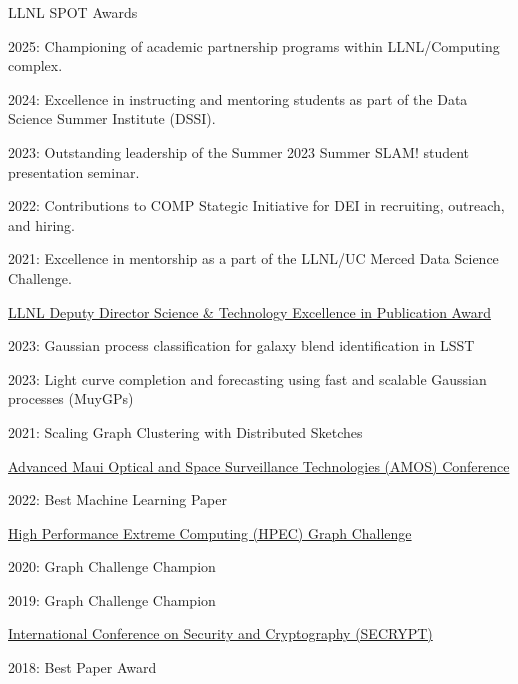LLNL SPOT Awards
\begin{innerlist}
  \item[] 2025: Championing of academic partnership programs within LLNL/Computing complex.
  \item[] 2024: Excellence in instructing and mentoring students as part of the Data Science Summer Institute (DSSI).
  \item[] 2023: Outstanding leadership of the Summer 2023 Summer SLAM! student presentation seminar. 
  \item[] 2022: Contributions to COMP Stategic Initiative for DEI in recruiting, outreach, and hiring.
  \item[] 2021: Excellence in mentorship as a part of the LLNL/UC Merced Data Science Challenge.
\end{innerlist}

\halfblankline

\href{https://st.llnl.gov/news/directors-awards}{LLNL Deputy Director Science \& Technology Excellence in Publication Award}
\begin{innerlist}
  \item[] 2023: Gaussian process classification for galaxy blend identification in LSST
  \item[] 2023: Light curve completion and forecasting using fast and scalable Gaussian processes (MuyGPs)
  \item[] 2021: Scaling Graph Clustering with Distributed Sketches
\end{innerlist}

\halfblankline

\href{https://amostech.com/}{Advanced Maui Optical and Space Surveillance Technologies (AMOS) Conference}
\begin{innerlist}
  \item[] 2022: Best Machine Learning Paper
\end{innerlist}

\halfblankline

\href{https://graphchallenge.mit.edu/champions}{High Performance Extreme Computing (HPEC) Graph Challenge}
\begin{innerlist}
  \item[] 2020: Graph Challenge Champion
  \item[] 2019: Graph Challenge Champion
\end{innerlist}

\halfblankline

\href{http://www.secrypt.icete.org/PreviousAwards.aspx}{International Conference on Security and Cryptography (SECRYPT)}
\begin{innerlist}
  \item[] 2018: Best Paper Award
\end{innerlist}


